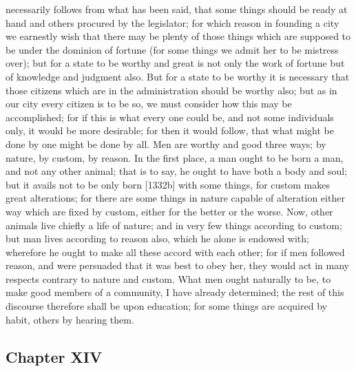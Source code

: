 \documentclass[12pt]{article}
\begin{document}
necessarily follows from what has been said, that some things should be ready at hand and others procured by the legislator; for which reason in founding a city we earnestly wish that there may be plenty of those things which are supposed to be under the dominion of fortune (for some things we admit her to be mistress over); but for a state to be worthy and great is not only the work of fortune but of knowledge and judgment also. But for a state to be worthy it is necessary that those citizens which are in the administration should be worthy also; but as in our city every citizen is to be so, we must consider how this may be accomplished; for if this is what every one could be, and not some individuals only, it would be more desirable; for then it would follow, that what might be done by one might be done by all. Men are worthy and good three ways; by nature, by custom, by reason. In the first place, a man ought to be born a man, and not any other animal; that is to say, he ought to have both a body and soul; but it avails not to be only born [1332b] with some things, for custom makes great alterations; for there are some things in nature capable of alteration either way which are fixed by custom, either for the better or the worse. Now, other animals live chiefly a life of nature; and in very few things according to custom; but man lives according to reason also, which he alone is endowed with; wherefore he ought to make all these accord with each other; for if men followed reason, and were persuaded that it was best to obey her, they would act in many respects contrary to nature and custom. What men ought naturally to be, to make good members of a community, I have already determined; the rest of this discourse therefore shall be upon education; for some things are acquired by habit, others by hearing them.

\subsection*{Chapter XIV}
\end{document}
